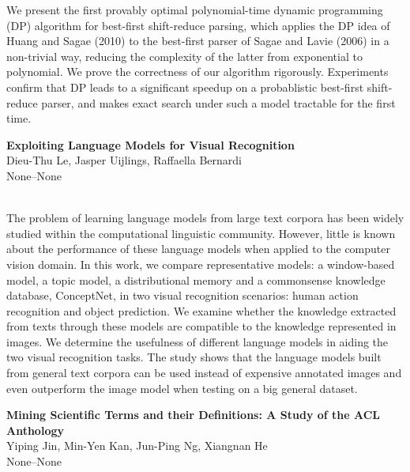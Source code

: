 \documentclass[twoside,makeidx]{book}
\renewcommand{\normalsize}{\fontsize{8}{9}\selectfont}
\renewcommand{\small}{\fontsize{7}{8}\selectfont}
\begin{document}
\nopagebreak%
\noindent%
{\small We present the first provably optimal polynomial-time dynamic programming (DP) algorithm for best-first shift-reduce parsing, which applies the DP idea of Huang and Sagae (2010) to the best-first parser of Sagae and Lavie (2006) in a non-trivial way, reducing the complexity of the latter from exponential to polynomial. We prove the correctness of our algorithm rigorously. Experiments confirm that DP leads to a significant speedup on a probablistic best-first shift-reduce parser, and makes exact search under such a model tractable for the first time.}
\par\vspace{2em}\noindent%
\begin{minipage}{\linewidth}%
\begin{center}
\textbf{\normalsize Exploiting Language Models for Visual Recognition}\\
\normalsize  Dieu-Thu Le,  Jasper Uijlings,  Raffaella Bernardi\\
{\small None--None}\\
\end{center}
\end{minipage}\\[0.5em]
\nopagebreak%
\noindent%
{\small The problem of learning language models from large text corpora has been widely studied within the computational linguistic community. However, little is known about the performance of these language models when applied to the computer vision domain. In this work, we compare representative models: a window-based model, a topic model, a distributional memory and a commonsense knowledge database, ConceptNet, in two visual recognition scenarios: human action recognition and object prediction. We examine whether the knowledge extracted from texts through these models are compatible to the knowledge represented in images. We determine the usefulness of different language models in aiding the two visual recognition tasks. The study shows that the language models built from general text corpora can be used instead of expensive annotated images and even outperform the image model when testing on a big general dataset.}
\par\vspace{2em}\noindent%
\begin{minipage}{\linewidth}%
\begin{center}
\textbf{\normalsize Mining Scientific Terms and their Definitions: A Study of the ACL Anthology}\\
\normalsize  Yiping Jin,  Min-Yen Kan,  Jun-Ping Ng,  Xiangnan He\\
{\small None--None}\\
\end{center}
\end{minipage}\\[0.5em]
\end{document}
